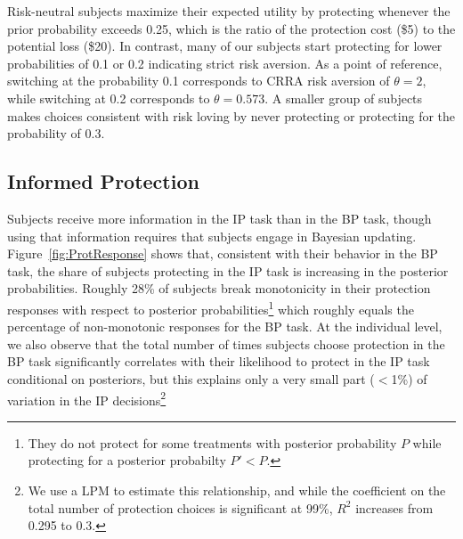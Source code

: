 \documentclass[12pt,a4paper]{article}
\begin{document}
Risk-neutral subjects maximize their expected utility by protecting whenever the prior probability exceeds 0.25, which is the ratio of the protection cost (\$5) to the potential loss (\$20). In contrast, many of our subjects start protecting for lower probabilities of 0.1 or 0.2 indicating strict risk aversion. As a point of reference, switching at the probability 0.1 corresponds to CRRA risk aversion of $\theta=2$, while switching at 0.2 corresponds to $\theta=0.573$.  A smaller group of subjects makes choices consistent with risk loving by never protecting or protecting for the probability of 0.3. 

\subsection{Informed Protection}
Subjects receive more information in the IP task than in the BP task, though using that information requires that subjects engage in Bayesian updating.  Figure~\ref{fig:ProtResponse} shows that, consistent with their behavior in the BP task, the share of subjects protecting in the IP task is increasing in the posterior probabilities. Roughly 28\% of subjects break monotonicity in their protection responses with respect to posterior probabilities\footnote{ They do not protect for some treatments with posterior probability $P$ while protecting for a posterior probabilty $P'<P$.} which roughly equals the percentage of non-monotonic responses for the BP task. At the individual level, we also observe that the total number of times subjects choose protection in the BP task significantly correlates with their likelihood to protect in the IP task conditional on posteriors, but this explains only a very small part ($<$1\%) of variation in the IP decisions\footnote{We use a LPM to estimate this relationship, and while the coefficient on the total number of protection choices is significant at 99\%, $R^2$ increases from 0.295 to 0.3.} 


\end{document}
